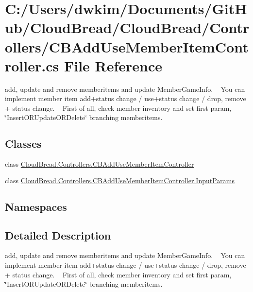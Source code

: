 \hypertarget{a00199}{}\section{C\+:/\+Users/dwkim/\+Documents/\+Git\+Hub/\+Cloud\+Bread/\+Cloud\+Bread/\+Controllers/\+C\+B\+Add\+Use\+Member\+Item\+Controller.cs File Reference}
\label{a00199}


add, update and remove memberitems and update Member\+Game\+Info. ~\newline
You can implement member item add+status change / use+status change / drop, remove + status change. ~\newline
First of all, check member inventory and set first param, \char`\"{}\+Insert\+O\+R\+Update\+O\+R\+Delete\char`\"{} branching memberitems.  


\subsection*{Classes}
\begin{DoxyCompactItemize}
\item 
class \hyperlink{a00024}{Cloud\+Bread.\+Controllers.\+C\+B\+Add\+Use\+Member\+Item\+Controller}
\item 
class \hyperlink{a00102}{Cloud\+Bread.\+Controllers.\+C\+B\+Add\+Use\+Member\+Item\+Controller.\+Input\+Params}
\end{DoxyCompactItemize}
\subsection*{Namespaces}
\begin{DoxyCompactItemize}
\end{DoxyCompactItemize}


\subsection{Detailed Description}
add, update and remove memberitems and update Member\+Game\+Info. ~\newline
You can implement member item add+status change / use+status change / drop, remove + status change. ~\newline
First of all, check member inventory and set first param, \char`\"{}\+Insert\+O\+R\+Update\+O\+R\+Delete\char`\"{} branching memberitems. 

